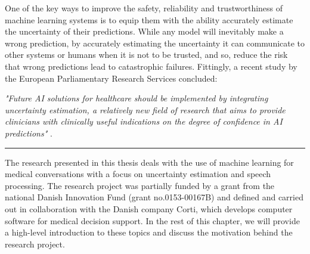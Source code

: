 One of the key ways to improve the safety, reliability and trustworthiness of machine learning systems is to equip them with the ability accurately estimate the uncertainty of their predictions. 
While any model will inevitably make a wrong prediction, by accurately estimating the uncertainty it can communicate to other systems or humans when it is not to be trusted, and so, reduce the risk that wrong predictions lead to catastrophic failures. 
Fittingly, a recent study by the European Parliamentary Research Services concluded: 

\begin{center}

\textit{"Future AI solutions for healthcare should be implemented by integrating uncertainty estimation, a relatively new field of research that aims to provide clinicians with clinically useful indications on the degree of confidence in AI predictions"} \parencite{europeanparliament_artificial_2022}. 

\end{center}

\vspace{0.5em}
\begin{center}
\noindent\rule{0.2\textwidth}{0.5pt}
\end{center}
\vspace{1em}

\noindent The research presented in this thesis deals with the use of machine learning for medical conversations with a focus on uncertainty estimation and speech processing. 
The research project was partially funded by a grant from the national Danish Innovation Fund (grant no.\@ 0153-00167B) and defined and carried out in collaboration with the Danish company Corti, which develops computer software for medical decision support. 
In the rest of this chapter, we will provide a high-level introduction to these topics and discuss the motivation behind the research project.



